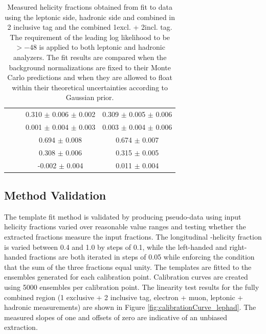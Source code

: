 \begin{table}[]
\begin{tabular}{c|c|c|c}
                       	  & \fl 	& 0.310 $\pm$ 0.006 $\pm$ 0.002 & 0.309 $\pm$ 0.005 $\pm$ 0.006 \\  
                       	  & \fr 	& 0.001 $\pm$ 0.004 $\pm$ 0.003 & 0.003 $\pm$ 0.004 $\pm$ 0.006 \\ \hline \
\multirow{2}{*}{Floating} & \fo 	& 0.694 $\pm$ 0.008 & 0.674 $\pm$ 0.007 \\ 
                          & \fl 	& 0.308 $\pm$ 0.006 & 0.315 $\pm$ 0.005 \\  
                          & \fr 	& -0.002 $\pm$ 0.004 & 0.011 $\pm$  0.004 \\ \hline \hline
\end{tabular}
\caption{Measured helicity fractions obtained from fit to data using the leptonic side, hadronic side and combined in 2 inclusive \bt tag and the combined 1excl. + 2incl. \bt tag. The requirement of the leading log likelihood to be $>-48$ is applied to both leptonic and hadronic analyzers. The fit results are compared when the background normalizations are fixed to their Monte Carlo predictions and when they are allowed to float within their theoretical uncertainties according to Gaussian prior. %
}
\label{tab:DataFit_floatVSfix}
\end{table}

\subsection{Method Validation}
The template fit method is validated by producing pseudo-data using input helicity fractions varied over reasonable value ranges and testing whether the extracted fractions measure the input fractions. The longitudinal \w-helicity fraction is varied between 0.4 and 1.0 by steps of 0.1, while the left-handed and right-handed fractions are both iterated in steps of 0.05 while enforcing the condition that the sum of the three fractions equal unity. The templates are fitted to the ensembles generated for each calibration point. Calibration curves are created using 5000 ensembles per calibration point. The linearity test results for the fully combined region (1 exclusive + 2 inclusive \bt tag, electron + muon, leptonic + hadronic measurements) are shown in Figure \ref{fig:calibrationCurve_lephad}. The measured slopes of one and offsets of zero are indicative of an unbiased extraction. 

